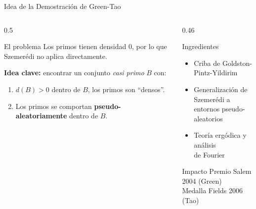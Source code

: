 \begin{frame}{Idea de la Demostración de Green-Tao}

    \begin{columns}[T]

        \begin{column}{0.5\textwidth}
            \begin{block}{El problema}
                Los primos tienen densidad $0$, por lo que
                Szemerédi no aplica directamente.
            \end{block}

            \vspace{0.3cm}

            \textbf{Idea clave:} encontrar un conjunto \textit{casi
            primo} $B$ con:
            \begin{enumerate}
                \item $d(B) > 0$ dentro de $B$, los primos son
                      ``densos''.
                \item Los primos se comportan \textbf{pseudo-aleatoriamente}
                      dentro de $B$.
            \end{enumerate}
        \end{column}

        \begin{column}{0.46\textwidth}
            \begin{exampleblock}{Ingredientes}
                \begin{itemize}
                    \item Criba de Goldston-Pintz-Yildirim
                    \item Generalización de Szemerédi a\\
                          entornos pseudo-aleatorios
                    \item Teoría ergódica y análisis\\
                          de Fourier
                \end{itemize}
            \end{exampleblock}

            \vspace{0.3cm}

            \begin{alertblock}{Impacto}
                Premio Salem 2004 (Green)\\
                Medalla Fields 2006 (Tao)
            \end{alertblock}
        \end{column}

    \end{columns}

\end{frame}
